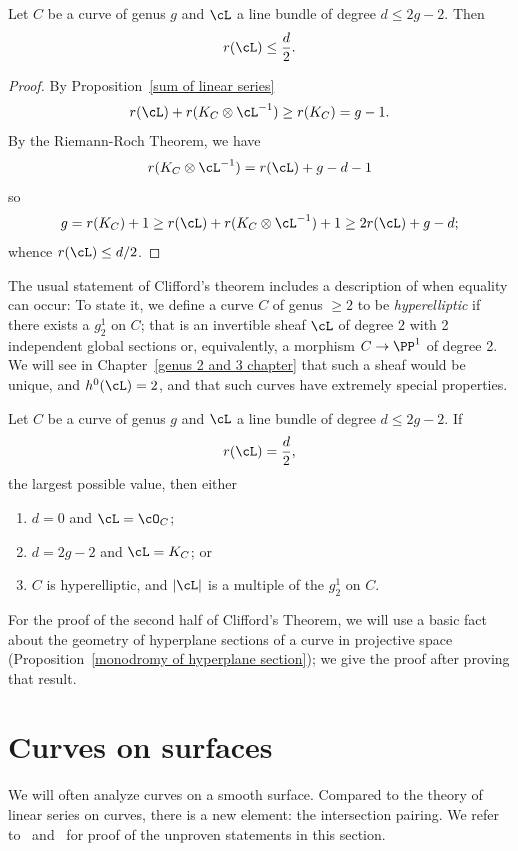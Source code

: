 \begin{corollary}\label{Clifford bound}
 Let $C$ be a curve of genus $g$ and $\cL$ a line bundle of degree $d \leq 2g-2$. Then
$$
r(\cL) \leq \frac{d}{2}.
$$
\end{corollary}

\begin{proof}
By Proposition~\ref{sum of linear series}
$$
r(\cL) + r(K_C\otimes \cL^{-1}) \geq r(K_C) = g-1.
$$
By the Riemann-Roch Theorem, we have
$$
r(K_C\otimes \cL^{-1}) = r(\cL) + g - d - 1
$$
so 
$$
g = r(K_C) + 1 \geq r(\cL) + r(K_C\otimes \cL^{-1}) + 1 \geq 2r(\cL) +g - d;
$$
whence $r(\cL) \leq d/2$.
\end{proof}

The usual statement of Clifford's theorem includes a description of when equality can occur:
To state it, we define a curve $C$ of genus $\geq 2$ to be \emph{hyperelliptic} if there exists a $g^1_2$ on $C$; that is an
invertible sheaf $\cL$ of degree $2$ with 2 independent global sections or, equivalently, a morphism $C\to \PP^1$ of degree 2. We will see in Chapter~\ref{genus 2 and 3 chapter} that such a sheaf would be unique, and $h^0(\cL) = 2$, and that such curves have extremely special properties.

\begin{theorem}\label{Clifford}\label{Clifford equality}
Let $C$ be a curve of genus $g$ and $\cL$ a line bundle of degree $d \leq 2g-2$. If
$$
r(\cL) = \frac{d}{2},
$$
the largest possible value, then either
\begin{enumerate}
\item $d=0$ and $\cL = \cO_C$;
\item $d = 2g-2$ and $\cL = K_C$; or
\item $C$ is hyperelliptic, and $|\cL|$ is a multiple of the $g^1_2$ on $C$.
\end{enumerate}
\end{theorem}

For the proof of the second half of Clifford's Theorem, we will use a basic fact about the geometry of hyperplane sections of a curve in projective space (Proposition~\ref{monodromy of hyperplane section}); we give the proof after proving that result.


 \section{Curves on surfaces}
 We will often analyze curves  on a smooth surface. Compared to the theory of linear series on curves, there is a new element: the intersection pairing. We refer to~\cite[Chapter V]{Hartshorne1977}
 and~\cite[Chapter I]{Beauville} for proof of the unproven statements in this section.
 
